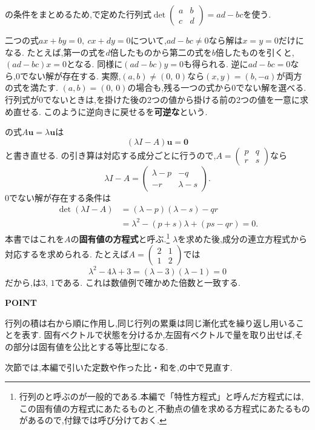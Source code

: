 の条件をまとめるため,で定めた行列式$\det\begin{pmatrix}a&b\\c&d\end{pmatrix}=ad-bc$を使う.

二つの式$ax+by=0,\ cx+dy=0$について,$ad-bc\ne0$なら解は$x=y=0$だけになる.
たとえば,第一の式を$d$倍したものから第二の式を$b$倍したものを引くと,$(ad-bc)x=0$となる.
同様に$(ad-bc)y=0$も得られる.
逆に$ad-bc=0$なら,0でない解が存在する.
実際,$(a,b)\ne(0,\,0)$なら$(x,y)=(b,-a)$が両方の式を満たす.
$(a,b)=(0,\,0)$の場合も,残る一つの式から0でない解を選べる.
行列式が$0$でないときは,を掛けた後の2つの値から掛ける前の2つの値を一意に求め直せる.
このように逆向きに戻せるを\textbf{可逆な}という.

の式$A\boldsymbol{u}=\lambda\boldsymbol{u}$は
\[
  (\lambda I-A)\boldsymbol{u}=\boldsymbol{0}
\]
と書き直せる.
の引き算は対応する成分ごとに行うので,$A=\begin{pmatrix}p&q\\r&s\end{pmatrix}$なら
\[
  \lambda I-A
  =\begin{pmatrix}\lambda-p&-q\\-r&\lambda-s\end{pmatrix}.
\]
0でない解が存在する条件は
\[
  \begin{aligned}
    \det(\lambda I-A)
    &=(\lambda-p)(\lambda-s)-qr\\
    &=\lambda^2-(p+s)\lambda+(ps-qr)=0.
  \end{aligned}
\]
本書ではこれを$A$の\textbf{固有値の方程式}と呼ぶ.\footnote{行列のと呼ぶのが一般的である.本編で「特性方程式」と呼んだ方程式には,この固有値の方程式にあたるものと,不動点の値を求める方程式にあたるものがあるので,付録では呼び分けておく.}
$\lambda$を求めた後,成分の連立方程式から対応するを求められる.
たとえば$A=\begin{pmatrix}2&1\\1&2\end{pmatrix}$では
\[
  \lambda^2-4\lambda+3
  =(\lambda-3)(\lambda-1)=0
\]
だから,は$3,\,1$である.
これは数値例で確かめた倍数と一致する.

\begin{bookpoint}
  \textbf{POINT}\par
  行列の積は右から順に作用し,同じ行列の累乗は同じ漸化式を繰り返し用いることを表す.
  固有ベクトルで状態を分けるか,左固有ベクトルで量を取り出せば,その部分は固有値を公比とする等比型になる.
\end{bookpoint}

次節では,本編で引いた定数や作った比・和を,の中で見直す.
